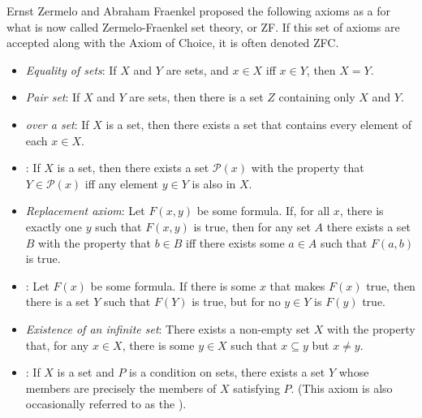 \documentclass{article}
\begin{document}
Ernst Zermelo and Abraham Fraenkel proposed the following axioms as a  for what is now called Zermelo-Fraenkel set theory, or ZF.  If this set of axioms are accepted along with the Axiom of Choice, it is often denoted ZFC.

\begin{itemize}
\item \emph{Equality of sets}: If $X$ and $Y$ are sets, and $x \in X$ iff $x \in Y$, then $X = Y$.
\item \emph{Pair set}: If $X$ and $Y$ are sets, then there is a set $Z$ containing only $X$ and $Y$.
\item \emph{ over a set}: If $X$ is a set, then there exists a set that contains every element of each $x \in X$.
\item \emph{}: If $X$ is a set, then there exists a set $\mathcal{P}(x)$ with the property that $Y \in \mathcal{P}(x)$ iff any element $y \in Y$ is also in $X$.
\item \emph{Replacement axiom}: Let $F(x,y)$ be some formula.  If, for all $x$, there is exactly one $y$ such that $F(x,y)$ is true, then for any set $A$ there exists a set $B$ with the property that $b \in B$ iff there exists some $a \in A$ such that $F(a,b)$ is true.
\item \emph{}: Let $F(x)$ be some formula.  If there is some $x$ that makes $F(x)$ true, then there is a set $Y$ such that $F(Y)$ is true, but for no $y \in Y$ is $F(y)$ true.
\item \emph{Existence of an infinite set}: There exists a non-empty set $X$ with the property that, for any $x \in X$, there is some $y \in X$ such that $x \subseteq y$ but $x \neq y$.
\item \emph{}:  If $X$ is a set and $P$ is a condition on sets, there exists a set $Y$ whose members are precisely the members of $X$ satisfying $P$.  (This axiom is also occasionally referred to as the \emph{}).
\end{itemize}
\end{document}
